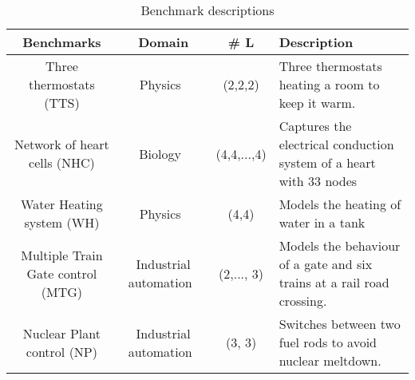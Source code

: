 \begin{table*}
	\centering
	\caption{Benchmark descriptions
	\label{tab:benchmarks}}
\begin{tabular}{ | c | c| c| l  |} \hline
\textbf{Benchmarks}
	& \textbf{Domain} 
	& \textbf{\# L } 
	& \textbf{Description} \\ \hline

	 Three thermostats (TTS) 
		& Physics~\cite{Pedro2005}
		& (2,2,2)
		& Three thermostats heating a room to keep it warm.\\ \hline
	Network of heart cells (NHC)  
		& Biology~\cite{chen201487}
		& (4,4,...,4)
		& Captures the electrical conduction system of a heart with 33 nodes\\ \hline


	Water Heating system (WH)  
		& Physics~\cite{raskin05}
		& (4,4)
		& Models the heating of water in a tank \\ \hline
	 Multiple Train Gate control (MTG)  
		& Industrial automation~\cite{Costello2013}
		& (2,..., 3)
		& Models the behaviour of a gate and six trains at a  rail road crossing.\\ \hline
	 Nuclear Plant control (NP)  
		& Industrial automation~\cite{alur2015book}
		& (3, 3)
		& Switches between two fuel rods to avoid nuclear meltdown.\\ \hline
	
	
 \end{tabular}
 \end{table*}